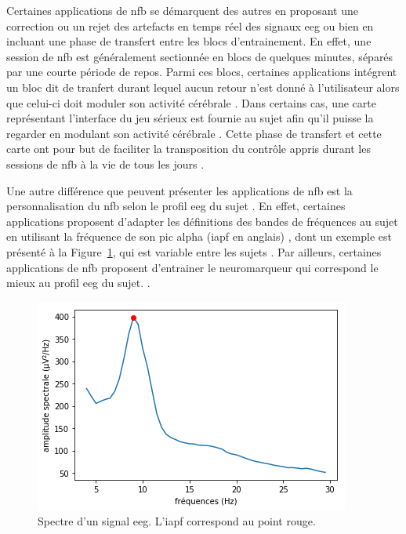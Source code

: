 Certaines applications de \gls{nfb} se démarquent des autres en proposant une correction ou un rejet des artefacts en temps réel des signaux \gls{eeg}
\citep{Maurizio2014, Barthelemy2019} ou bien en incluant une phase de transfert entre les blocs d'entrainement. En effet, une session de \gls{nfb} est 
généralement sectionnée en blocs de quelques minutes, séparés par une courte période de repos. Parmi ces blocs, certaines applications intégrent 
un bloc dit de tranfert durant lequel aucun retour n'est donné à l'utilisateur alors que celui-ci doit moduler son activité cérébrale \citep{Bioulac2019,
Bluschke2016}. Dans certains cas, une carte représentant l'interface du jeu sérieux est fournie au sujet afin qu'il puisse la regarder en modulant son 
activité cérébrale \citep{Leins2007}. Cette phase de transfert et cette carte ont pour but de faciliter la transposition du contrôle appris durant les 
sessions de \gls{nfb} à la vie de tous les jours \citep{Arns2014}.

Une autre différence que peuvent présenter les applications de \gls{nfb} est la personnalisation du \gls{nfb} selon le profil \gls{eeg} du sujet
\citep{Alkoby2017}. En effet, certaines applications proposent d'adapter les définitions des bandes de fréquences au sujet en utilisant la fréquence de son
pic alpha (\gls{iapf} en anglais) \citep{Alkoby2017, Escolano2014, Bazanova2018}, dont un exemple est présenté à la Figure~\ref{Figure:introduction_iapf}, 
qui est variable entre les sujets \citep{Haegens2014, Aurlien2004, Smit2006}. Par ailleurs, certaines applications de \gls{nfb} proposent d'entrainer 
le neuromarqueur qui correspond le mieux au profil \gls{eeg} du sujet.
\citep{Bioulac2019, Kerson2013}. 

\begin{figure}[h!]
  \centering
	\includegraphics[width=0.5\linewidth]{figures/chapter-1/introduction-iapf} 
  \caption{Spectre d'un signal \gls{eeg}. L'\gls{iapf} correspond au point rouge.}
  \label{Figure:introduction_iapf}
\end{figure}
 

